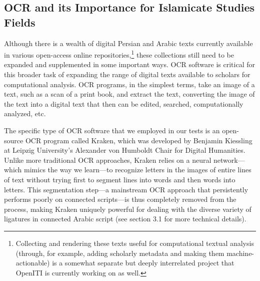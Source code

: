 \subsection{OCR and its Importance for Islamicate Studies Fields}

Although there is a wealth of digital Persian and Arabic texts currently
available in various open-access online repositories,\footnote{Collecting and
rendering these texts useful for computational textual analysis (through, for
example, adding scholarly metadata and making them machine-actionable) is a
somewhat separate but deeply interrelated project that OpenITI is currently
working on as well.} these collections still need to be expanded and
supplemented in some important ways. OCR software is critical for this broader
task of expanding the range of digital texts available to scholars for
computational analysis. OCR programs, in the simplest terms, take an image of a
text, such as a scan of a print book, and extract the text, converting the
image of the text into a digital text that then can be edited, searched,
computationally analyzed, etc.   

The specific type of OCR software that we employed in our tests is an
open-source OCR program called Kraken, which was developed by Benjamin
Kiessling at Leipzig University’s Alexander von Humboldt Chair for Digital
Humanities. Unlike more traditional OCR approaches, Kraken relies on a neural
network—which mimics the way we learn—to recognize letters in the images of
entire lines of text without trying first to segment lines into words and then
words into letters. This segmentation step—a mainstream OCR approach that
persistently performs poorly on connected scripts—is thus completely removed
from the process, making Kraken uniquely powerful for dealing with the diverse
variety of ligatures in connected Arabic script (see section 3.1 for more
technical details).

